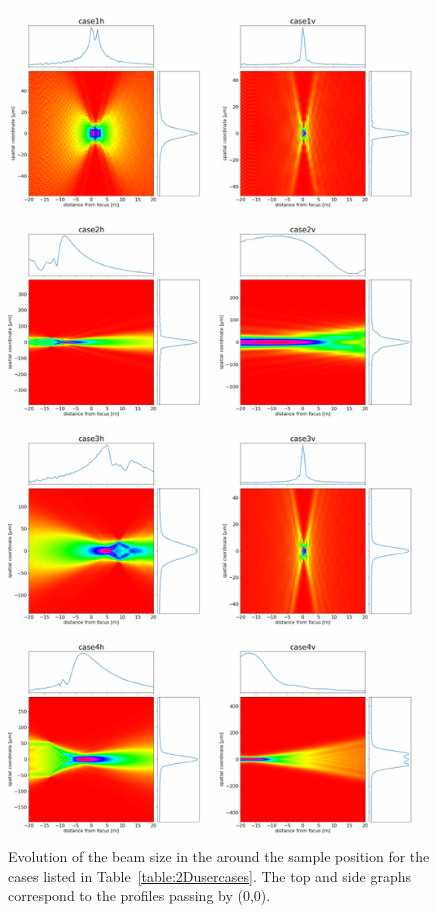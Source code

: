 \documentclass{iucr}              %
\begin{document}
\begin{figure}\label{fig:caustic}
\centering

\includegraphics[width=0.99\textwidth]{figures/fig_caustic.pdf}

\caption{Evolution of the beam size in the around the sample position for the cases listed in Table~\ref{table:2Dusercases}. The top and side graphs correspond to the profiles passing by (0,0).
}
\end{figure}
\end{document}
